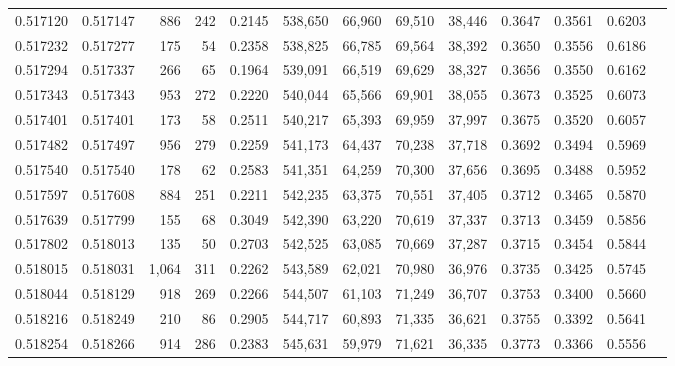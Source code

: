 \begin{tabular}{rrrrrrrrrrrrr}
0.517120 & 0.517147 &   886 &   242 &                                     0.2145 & 538,650 &  66,960 &  69,510 &  38,446 & 0.3647 & 0.3561 & 0.6203 \\
0.517232 & 0.517277 &   175 &    54 &                                     0.2358 & 538,825 &  66,785 &  69,564 &  38,392 & 0.3650 & 0.3556 & 0.6186 \\
0.517294 & 0.517337 &   266 &    65 &                                     0.1964 & 539,091 &  66,519 &  69,629 &  38,327 & 0.3656 & 0.3550 & 0.6162 \\
0.517343 & 0.517343 &   953 &   272 &                                     0.2220 & 540,044 &  65,566 &  69,901 &  38,055 & 0.3673 & 0.3525 & 0.6073 \\
0.517401 & 0.517401 &   173 &    58 &                                     0.2511 & 540,217 &  65,393 &  69,959 &  37,997 & 0.3675 & 0.3520 & 0.6057 \\
0.517482 & 0.517497 &   956 &   279 &                                     0.2259 & 541,173 &  64,437 &  70,238 &  37,718 & 0.3692 & 0.3494 & 0.5969 \\
0.517540 & 0.517540 &   178 &    62 &                                     0.2583 & 541,351 &  64,259 &  70,300 &  37,656 & 0.3695 & 0.3488 & 0.5952 \\
0.517597 & 0.517608 &   884 &   251 &                                     0.2211 & 542,235 &  63,375 &  70,551 &  37,405 & 0.3712 & 0.3465 & 0.5870 \\
0.517639 & 0.517799 &   155 &    68 &                                     0.3049 & 542,390 &  63,220 &  70,619 &  37,337 & 0.3713 & 0.3459 & 0.5856 \\
0.517802 & 0.518013 &   135 &    50 &                                     0.2703 & 542,525 &  63,085 &  70,669 &  37,287 & 0.3715 & 0.3454 & 0.5844 \\
0.518015 & 0.518031 & 1,064 &   311 &                                     0.2262 & 543,589 &  62,021 &  70,980 &  36,976 & 0.3735 & 0.3425 & 0.5745 \\
0.518044 & 0.518129 &   918 &   269 &                                     0.2266 & 544,507 &  61,103 &  71,249 &  36,707 & 0.3753 & 0.3400 & 0.5660 \\
0.518216 & 0.518249 &   210 &    86 &                                     0.2905 & 544,717 &  60,893 &  71,335 &  36,621 & 0.3755 & 0.3392 & 0.5641 \\
0.518254 & 0.518266 &   914 &   286 &                                     0.2383 & 545,631 &  59,979 &  71,621 &  36,335 & 0.3773 & 0.3366 & 0.5556 \\

\end{tabular}
